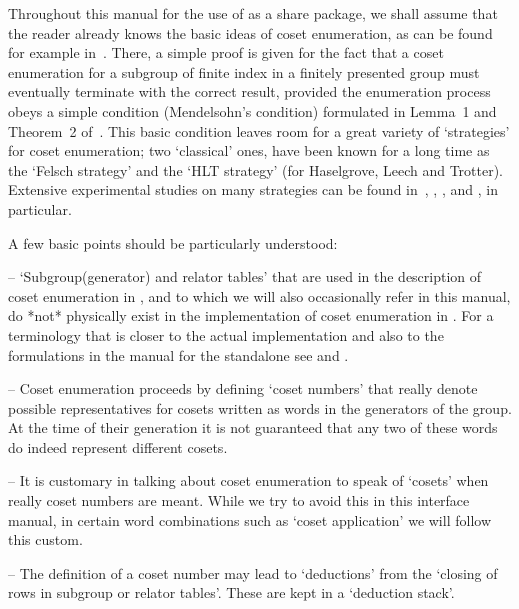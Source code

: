 
Throughout this manual for  the  use  of  {\ACE}  as  a  {\GAP}  share
package, we shall assume that the reader already knows the basic ideas
of coset enumeration, as can be  found  for  example  in~\cite{Neu82}.
There, a simple proof is given for the fact that a  coset  enumeration
for a subgroup of finite index in  a  finitely  presented  group  must
eventually terminate with the correct result, provided the enumeration
process obeys a simple condition (Mendelsohn's  condition)  formulated
in Lemma~1 and Theorem~2 of~\cite{Neu82}. This basic condition  leaves
room for a great variety of \lq{}strategies'  for  coset  enumeration;
two \lq{}classical' ones, have been known  for  a  long  time  as  the
\lq{}Felsch strategy' and  the  \lq{}HLT  strategy'  (for  Haselgrove,
Leech and Trotter). Extensive experimental studies on many  strategies
can  be  found  in~\cite{CDHW73},  \cite{Hav91},   \cite{HR99a},   and
\cite{HR99b}, in particular.

A few basic points should be particularly understood:

\beginlist

\item{--} \lq{}Subgroup(generator) and relator tables' that  are  used
in the description of coset enumeration in \cite{Neu82}, and to  which
we will also occasionally refer in this manual,  do  *not*  physically
exist in the implementation of coset  enumeration  in  {\ACE}.  For  a
terminology that is closer to the actual implementation  and  also  to
the  formulations  in  the  manual  for  the  {\ACE}  standalone   see
\cite{CDHW73} and \cite{Hav91}.

\item{--} Coset enumeration proceeds by defining  \lq{}coset  numbers'
that really denote possible  representatives  for  cosets  written  as
words in the generators of the group. At the time of their  generation
it is not guaranteed that any two of these words do  indeed  represent
different cosets.

\item{--} It is customary in  talking about coset enumeration to speak
of \lq{}cosets' when really coset  numbers are meant. While  we try to
avoid this in this interface manual, in certain word combinations such
as \lq{}coset application' we will follow this custom.

\item{--} The   definition   of   a   coset   number   may   lead   to
\lq{}deductions' from the \lq{}closing of rows in subgroup or  relator
tables'. These are kept in a \lq{}deduction stack'.

